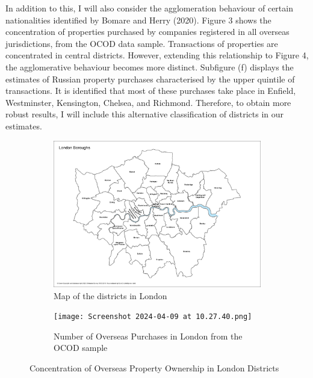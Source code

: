 \documentclass{article}
\begin{document}
In addition to this, I will also consider the agglomeration behaviour of certain nationalities identified by Bomare and Herry (2020). Figure 3 shows the concentration of properties purchased by companies registered in all overseas jurisdictions, from the OCOD data sample. Transactions of properties are concentrated in central districts. However, extending this relationship to Figure 4, the agglomerative behaviour becomes more distinct. Subfigure (f) displays the estimates of Russian property purchases characterised by the upper quintile of transactions. It is identified that most of these purchases take place in Enfield, Westminster, Kensington, Chelsea, and Richmond. Therefore, to obtain more robust results, I will include this alternative classification of districts in our estimates.


\begin{figure}[H]
    \centering
    \begin{subfigure}[b]{0.9\textwidth}
        \includegraphics[width=\textwidth]{London_Borough_Boundary_Map_A4.pdf}
        \caption{Map of the districts in London}
        \label{fig:sub1}
    \end{subfigure}
    
    \begin{subfigure}[b]{0.9\textwidth}
        \texttt{[image: Screenshot 2024-04-09 at 10.27.40.png]}
        \caption{Number of Overseas Purchases in London from the OCOD sample \footnotemark}
        \label{fig:sub2}
    \end{subfigure}
    \caption{Concentration of Overseas Property Ownership in London Districts }
\end{figure}
\end{document}
